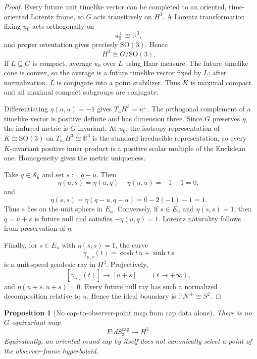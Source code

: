 \documentclass[11pt]{article}
\newtheorem{proposition}[theorem]{Proposition}
\begin{document}
\begin{proof}
Every future unit timelike vector can be completed to an oriented,
time-oriented Lorentz frame, so \(G\) acts transitively on \(H^3\). A Lorentz
transformation fixing \(u_0\) acts orthogonally on
\[
u_0^\perp\cong\mathbb R^3,
\]
and proper orientation gives precisely \(\mathrm{SO}(3)\). Hence
\[
H^3\cong G/\mathrm{SO}(3).
\]
If \(L\subseteq G\) is compact, average \(u_0\) over \(L\) using Haar measure.
The future timelike cone is convex, so the average is a future timelike vector
fixed by \(L\); after normalization, \(L\) is conjugate into a point
stabilizer. Thus \(K\) is maximal compact and all maximal compact subgroups
are conjugate.

Differentiating \(\eta(u,u)=-1\) gives \(T_uH^3=u^\perp\). The orthogonal
complement of a timelike vector is positive definite and has dimension three.
Since \(G\) preserves \(\eta\), the induced metric is \(G\)-invariant. At
\(u_0\), the isotropy representation of \(K\cong\mathrm{SO}(3)\) on
\(T_{u_0}H^3\cong\mathbb R^3\) is the standard irreducible representation, so
every \(K\)-invariant positive inner product is a positive scalar multiple of
the Euclidean one. Homogeneity gives the metric uniqueness.

Take \(q\in\mathcal S_u\) and set \(s:=q-u\). Then
\[
\eta(u,s)=\eta(u,q)-\eta(u,u)=-1+1=0,
\]
and
\[
\eta(s,s)=\eta(q-u,q-u)=0-2(-1)-1=1.
\]
Thus \(s\) lies on the unit sphere in \(E_u\). Conversely, if \(s\in E_u\)
and \(\eta(s,s)=1\), then \(q=u+s\) is future null and satisfies
\(-\eta(u,q)=1\). Lorentz naturality follows from preservation of \(\eta\).

Finally, for \(s\in E_u\) with \(\eta(s,s)=1\), the curve
\[
\gamma_{u,s}(t)=\cosh t\,u+\sinh t\,s
\]
is a unit-speed geodesic ray in \(H^3\). Projectively,
\[
[\gamma_{u,s}(t)]\longrightarrow [u+s]\qquad(t\to+\infty),
\]
and \(\eta(u+s,u+s)=0\). Every future null ray has such a normalized
decomposition relative to \(u\). Hence the ideal boundary is
\(\mathbb P\mathcal N^+\cong S^2\).
\end{proof}

\begin{proposition}[No cap-to-observer-point map from cap data alone]
\label{prop:no-cap-to-observer-point-map}
There is no \(G\)-equivariant map
\[
F:dS_3^{\mathrm{cap}}\longrightarrow H^3.
\]
Equivalently, an oriented round cap by itself does not canonically select a
point of the observer-frame hyperboloid.
\end{proposition}
\end{document}
